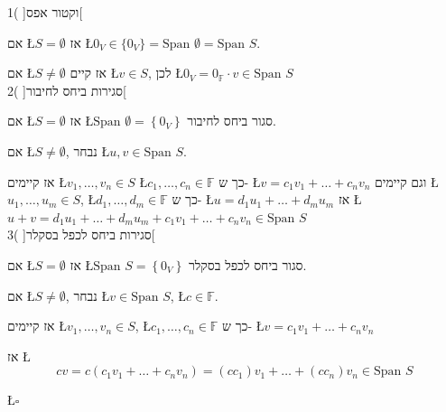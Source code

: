 \documentclass[english,hebrew]{article}
\newcommand{\spn}{\text{Span }}
\begin{document}
1( {]}וקטור אפס{[}

אם \L{$S=\emptyset$} אז \L{$0_{V}\in\{0_{V}\}=\spn\emptyset=\spn S$}.

אם \L{$S\neq\emptyset$} אז קיים \L{$v\in S$}, לכן \L{$0_{V}=0_{\mathbb{F}}\cdot v\in\spn S$}\\

2( {]}סגירות ביחס לחיבור{[}

אם \L{$S=\emptyset$} אז \L{$\spn\emptyset=\left\{ 0_{V}\right\} $}
סגור ביחס לחיבור.

אם \L{$S\neq\emptyset$}, נבחר \L{$u,v\in\spn S$}.

אז קיימים \L{$v_{1},\dots,v_{n}\in S$} \L{$c_{1},\dots,c_{n}\in\mathbb{F}$}
כך ש- \L{$v=c_{1}v_{1}+\dots+c_{n}v_{n}$} וגם קיימים \L{$u_{1},\dots,u_{m}\in S$},
\L{$d_{1},\dots,d_{m}\in\mathbb{F}$} כך ש- \L{$u=d_{1}u_{1}+\dots+d_{m}u_{m}$}
אז \L{$u+v=d_{1}u_{1}+\dots+d_{m}u_{m}+c_{1}v_{1}+\dots+c_{n}v_{n}\in\spn S$}\\

3( {]}סגירות ביחס לכפל בסקלר{[}

אם \L{$S=\emptyset$} אז \L{$\spn S=\left\{ 0_{V}\right\} $} סגור
ביחס לכפל בסקלר.

אם \L{$S\neq\emptyset$}, נבחר \L{$v\in\spn S$}, \L{$c\in\mathbb{F}$}.

אז קיימים \L{$v_{1},\dots,v_{n}\in S$}, \L{$c_{1},\dots,c_{n}\in\mathbb{F}$}
כך ש- \L{$v=c_{1}v_{1}+\dots+c_{n}v_{n}$} 

אז \L{%
\[
cv=c\left(c_{1}v_{1}+\dots+c_{n}v_{n}\right)=\left(cc_{1}\right)v_{1}+\dots+\left(cc_{n}\right)v_{n}\in\spn S
\]
}%

\begin{flushright}
\L{$\square$}
\par\end{flushright}
\end{document}
